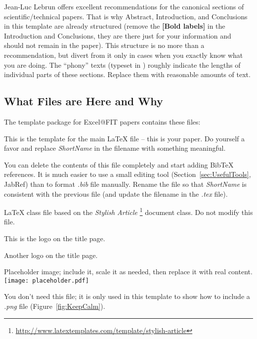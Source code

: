 \documentclass{ExcelAtFIT}
\begin{document}
Jean-Luc Lebrun \cite{Lebrun2011} offers excellent recommendations for the canonical sections of scientific/technical papers.  That is why Abstract, Introduction, and Conclusions in this template are already structured (remove the \textbf{[Bold labels]} in the Introduction and Conclusions, they are there just for your information and should not remain in the paper).  This structure is no more than a recommendation, but divert from it only in cases when you exactly know what you are doing.  The ``phony'' texts (typeset in ) roughly indicate the lengths of individual parts of these sections.  Replace them with reasonable amounts of text.

\subsection{What Files are Here and Why}
\label{sec:FilesInTemplate}

The template package for Excel@FIT papers contains these files:
\begin{description}[noitemsep]
	\item[2016-ExcelFIT-ShortName.tex] This is the template for the main \LaTeX{} file -- this is your paper.  Do yourself a favor and replace \textit{ShortName} in the filename with something meaningful.
	\item[2016-ExcelFIT-ShortName-bib.bib] You can delete the contents of this file completely and start adding BibTeX references.  It is much easier to use a small editing tool (Section~\ref{sec:UsefulTools}, JabRef) than to format \textit{.bib} file manually.  Rename the file so that \textit{ShortName} is consistent with the previous file (and update the filename in the \textit{.tex} file).
	\item[ExcelAtFIT.cls] \LaTeX{} class file based on the \emph{Stylish Article}%
	  \footnote{\url{http://www.latextemplates.com/template/stylish-article}} document class.  Do not modify this file.
	\item[ExcelAtFIT-logo.pdf] This is the logo on the title page.
	\item[VUT-FIT-logo.pdf] Another logo on the title page.
	\item[images/placeholder.pdf] Placeholder image; include it, scale it as needed, then replace it with real content.\\ \texttt{[image: placeholder.pdf]}
	\item[images/keep-calm.png] You don't need this file; it is only used in this template to show how to include a \textit{.png} file (Figure~\ref{fig:KeepCalm}).
\end{description}
\end{document}
